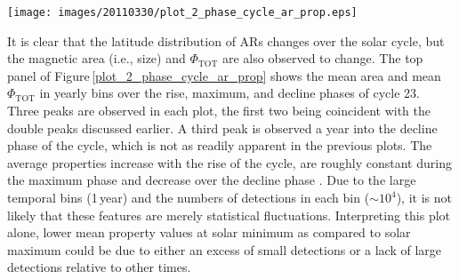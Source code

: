 \documentclass[namedreferences]{solarphysics}
\begin{document}
\begin{article}
\begin{figure*}[!ht]
\texttt{[image: images/20110330/plot\_2\_phase\_cycle\_ar\_prop.eps]}
\caption{\emph{Top}: Average magnetic feature area and $\Phi_{\mathrm{TOT}}$ in yearly, 6-month, and 3-month bins (black, dashed gray, and gray lines, respectively). Vertical red lines denote beginning and end of solar cycle phases. Arrows indicate peaks in $\langle$area$\rangle$ and $\langle\Phi\rangle$. \emph{Middle}: Distributions of detection areas for ``rise" (dashed line), ``maximum" (black line), and ``decline" (gray line) phases defined in \emph{top} panel. A power-law fit to the rise-phase distribution is indicated by the solid red line and the bounds of the fit are indicated by the vertical red dashed lines. \emph{Bottom}: Same as \emph{middle} panel, but showing $\Phi_{\mathrm{TOT}}$.}
\label{plot_2_phase_cycle_ar_prop}
\end{figure*}


It is clear that the latitude distribution of ARs changes over the solar cycle, but the magnetic area (i.e., size) and $\Phi_{\mathrm{TOT}}$ are also observed to change. The top panel of Figure\,\ref{plot_2_phase_cycle_ar_prop} shows the mean area and mean $\Phi_{\mathrm{TOT}}$ in yearly bins over the rise, maximum, and decline phases of cycle 23. Three peaks are observed in each plot, the first two being coincident with the double peaks discussed earlier. A third peak is observed a year into the decline phase of the cycle, which is not as readily apparent in the previous plots. The average properties increase with the rise of the cycle, are roughly constant during the maximum phase and decrease over the decline phase \citep[agreeing with the findings of][]{tang:1984}. Due to the large temporal bins (1\,year) and the numbers of detections in each bin ($\sim$$10^4$), it is not likely that these features are merely statistical fluctuations. Interpreting this plot alone, lower mean property values at solar minimum as compared to solar maximum could be due to either an excess of small detections or a lack of large detections relative to other times.


\end{article}
\end{document}
